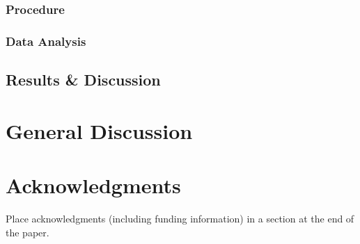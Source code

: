 \documentclass[10pt,letterpaper]{article}
\begin{document}
\subsubsection{Procedure} \quad

\subsubsection{Data Analysis} \quad

\subsection{Results \& Discussion}


\section{General Discussion}


\section{Acknowledgments}

Place acknowledgments (including funding information) in a section at
the end of the paper.



\setlength{\bibleftmargin}{.125in}
\setlength{\bibindent}{-\bibleftmargin}


\end{document}
